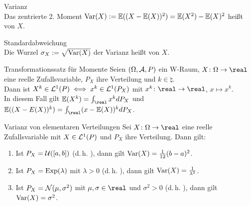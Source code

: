 \begin{Def}{Varianz}\\
    Das zentrierte 2. Moment $\text{Var}(X) := \mathbb{E}((X - \mathbb{E}(X))^2) = \mathbb{E}(X^2) - \mathbb{E}(X)^2$
    heißt  von $X$.
\end{Def}

\begin{Def}{Standardabweichung}\\
    Die Wurzel $\sigma_X := \sqrt{\text{Var}(X)}$ der Varianz heißt  von $X$.
\end{Def}

\linie

\begin{Satz}{Transformationssatz für Momente}
    Seien $(\Omega, \mathcal{A}, P)$ ein W-Raum, $X\colon \Omega \rightarrow \real$ eine reelle
    Zufallsvariable, $P_X$ ihre Verteilung und $k \in \natural$.\\
    Dann ist $X^k \in \mathcal{L}^1(P) \iff x^k \in \mathcal{L}^1(P_X)$ mit $x^k\colon \real \rightarrow \real$,
    $x \mapsto x^k$.\\
    In diesem Fall gilt $\EW(X^k) = \int_\real x^k dP_X$ und
    $\EW((X - E(X))^k) = \int_\real (x - \EW(X))^k dP_X$.
\end{Satz}

\begin{Satz}{Varianz von elementaren Verteilungen}
    Sei $X\colon \Omega \rightarrow \real$ eine reelle Zufallsvariable mit $X \in \mathcal{L}^1(P)$
    und $P_X$ ihre Verteilung.
    Dann gilt:
    \begin{enumerate}
        \item
        Ist $P_X = \mathcal{U}([a, b])$ (d.\,h. ),
        dann gilt $\text{Var}(X) = \frac{1}{12} (b - a)^2$.
        
        \item
        Ist $P_X = \text{Exp}(\lambda)$ mit $\lambda > 0$ (d.\,h. ),
        dann gilt $\text{Var}(X) = \frac{1}{\lambda^2}$.
        
        \item
        Ist $P_X = \mathcal{N}(\mu, \sigma^2)$ mit $\mu, \sigma \in \real$ und $\sigma^2 > 0$
        (d.\,h. ),
        dann gilt $\text{Var}(X) = \sigma^2$.
    \end{enumerate}
\end{Satz}

